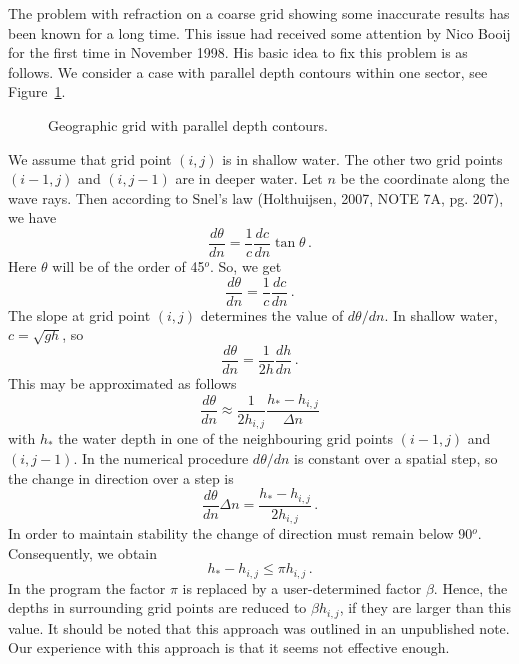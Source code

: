 \documentclass[12pt]{book}
\begin{document}
The problem with refraction on a coarse grid showing some inaccurate results has been known for a long time. This issue had received some attention by Nico Booij for the first time in November 1998.
His basic idea to fix this problem is as follows.
We consider a case with parallel depth
contours within one sector, see Figure~\ref{fig:refr2}.
\begin{figure}[htb]
   \centerline{
              }
      \caption{Geographic grid with parallel depth contours.}
      \label{fig:refr2}
\end{figure}
We assume that grid point $(i,j)$ is in shallow water. The other two grid points $(i-1,j)$ and $(i,j-1)$ are in deeper water.
Let $n$ be the coordinate along the wave rays.
Then according to Snel's law (Holthuijsen, 2007, NOTE 7A, pg. 207), we have
\begin{equation}
  \frac{d\theta}{dn} = \frac{1}{c}\frac{dc}{dn}\tan \theta\, .
\end{equation}
Here $\theta$ will be of the order of 45$^o$. So, we get
\begin{equation}
   \frac{d\theta}{dn} = \frac{1}{c}\frac{dc}{dn} \, .
\end{equation}
The slope at grid point $(i,j)$ determines the value of $d\theta/dn$. In shallow water, $c = \sqrt{gh}$, so
\begin{equation}
   \frac{d\theta}{dn} = \frac{1}{2h}\frac{dh}{dn} \, .
\end{equation}
This may be approximated as follows
\begin{equation}
  \frac{d\theta}{dn} \approx \frac{1}{2h_{i,j}}\frac{h_*-h_{i,j}}{\Delta n}
\end{equation}
with $h_*$ the water depth in one of the neighbouring grid points $(i-1,j)$ and $(i,j-1)$. In the numerical procedure $d\theta/dn$ is constant over a spatial step, so the change in direction over a step is
\begin{equation}
  \frac{d\theta}{dn} \Delta n = \frac{h_* - h_{i,j}}{2h_{i,j}} \, .
\end{equation}
In order to maintain stability the change of direction must remain below 90$^o$. Consequently, we obtain
\begin{equation}
  h_* - h_{i,j} \leq \pi h_{i,j} \, .
\end{equation}
In the program the factor $\pi$ is replaced by a user-determined factor $\beta$. Hence, the depths in surrounding grid points are reduced to $\beta h_{i,j}$, if they are larger than this value.
It should be noted that this approach was outlined in an unpublished note. Our experience with this approach is that it seems not effective enough.
\end{document}

